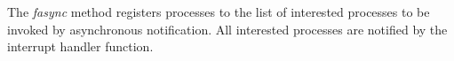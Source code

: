 The \emph{fasync} method registers processes to the list of interested processes to be invoked by asynchronous notification. All interested processes are notified by the interrupt handler function. 









